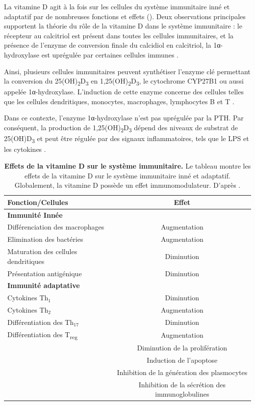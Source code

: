 \documentclass[
  a4paper,
  DIV=11,
  numbers=noendperiod,
  listof=totoc]{scrreprt}
\begin{document}
La vitamine D agit à la fois sur les cellules du système immunitaire
inné et adaptatif par de nombreuses fonctions et effets
(). Deux observations principales supportent la
théorie du rôle de la vitamine D dans le système immunitaire : le
récepteur au calcitriol est présent dans toutes les cellules
immunitaires, et la présence de l'enzyme de conversion finale du
calcidiol en calcitriol, la 1α-hydroxylase est uprégulée par certaines
cellules immunes \autocite{Giannini.2022}.

Ainsi, plusieurs cellules immunitaires peuvent synthétiser l'enzyme clé
permettant la conversion du 25(OH)\textsubscript{2}D\textsubscript{3} en
1,25(OH)\textsubscript{2}D\textsubscript{3}, le cytochrome CYP27B1 ou
aussi appelée 1α-hydroxylase. L'induction de cette enzyme concerne des
cellules telles que les cellules dendritiques, monocytes, macrophages,
lymphocytes B et T \autocites[ ]{Giannini.2022}{Dankers.2017}.

Dans ce contexte, l'enzyme 1α-hydroxylase n'est pas uprégulée par la
\ac{PTH}. Par conséquent, la production de
1,25(OH)\textsubscript{2}D\textsubscript{3} dépend des niveaux de
substrat de 25(OH)D\textsubscript{3} et peut être régulée par des
signaux inflammatoires, tels que le \ac{LPS} et les cytokines
\autocite{Giannini.2022}.

\begin{table}
\centering
\caption[Effets de la vitamine D sur le système immunitaire.]{\textbf{Effets de la vitamine D sur le système immunitaire.} Le tableau montre les effets de la vitamine D sur le système immunitaire inné et adaptatif. Globalement, la vitamine D possède un effet immunomodulateur. D'après \textcite{Giannini.2022}.}
\label{tbl:vd-immu}
\begin{tabular}{lc}
\toprule
\textbf{Fonction/Cellules} & \textbf{Effet} \\
\midrule
\textbf{Immunité Innée} & \\
Différenciation des macrophages & Augmentation \\
Elimination des bactéries & Augmentation \\
Maturation des cellules dendritiques & Diminution \\
Présentation antigénique & Diminution \\
\midrule
\textbf{Immunité adaptative} & \\
Cytokines Th$_1$ & Diminution \\
Cytokines Th$_2$ & Augmentation \\
Différentiation des Th${_{17}}$ & Diminution \\
Différentiation des T\textsubscript{reg} & Augmentation \\
\addlinespace
\multirow{4}{*}{Lymphocytes B} & Diminution de la prolifération \\
& Induction de l'apoptose \\
& Inhibition de la génération des plasmocytes \\
& Inhibition de la sécrétion des immunoglobulines\\
\bottomrule
\end{tabular}
\end{table}
\end{document}
